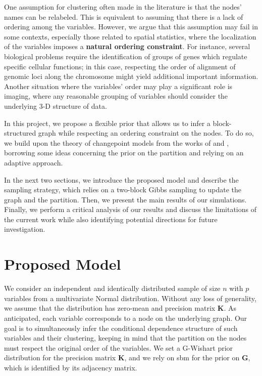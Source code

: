 One assumption for clustering often made in the literature is that the nodes' names can be relabeled. This is equivalent to assuming that there is a lack of ordering among the variables. However, we argue that this assumption may fail in some contexts, especially those related to spatial statistics, where the localization of the variables imposes a \textbf{natural ordering constraint}. For instance, several biological problems require the identification of groups of genes which regulate specific cellular functions; in this case, respecting the order of alignment of genomic loci along the chromosome might yield additional important information. Another situation where the variables' order may play a significant role is imaging, where any reasonable grouping of variables should consider the underlying 3-D structure of data.

In this project, we propose a flexible prior that allows us to infer a block-structured graph while respecting an ordering constraint on the nodes. To do so, we build upon the theory of changepoint models from the works of \textcite{bensonAdaptiveMCMCMultiple2018} and \textcite{martinezNonparametricChangePoint2014}, borrowing some ideas concerning the prior on the partition and relying on an adaptive approach. 

In the next two sections, we introduce the proposed model and describe the sampling strategy, which relies on a two-block Gibbs sampling to update the graph and the partition. Then, we present the main results of our simulations. Finally, we perform a critical analysis of our results and discuss the limitations of the current work while also identifying potential directions for future investigation.


\section{Proposed Model}

We consider an independent and identically distributed sample of size $n$ with $p$ variables from a multivariate Normal distribution. Without any loss of generality, we assume that the distribution has zero-mean and precision matrix $\bm{K}$. As anticipated, each variable corresponds to a node on the underlying graph. Our goal is to simultaneously infer the conditional dependence structure of such variables and their clustering, keeping in mind that the partition on the nodes must respect the original order of the variables. We set a G-Wishart prior distribution for the precision matrix $\bm{K}$, and we rely on \gls{sbm} for the prior on $\bm{G}$, which is identified by its adjacency matrix.\\


